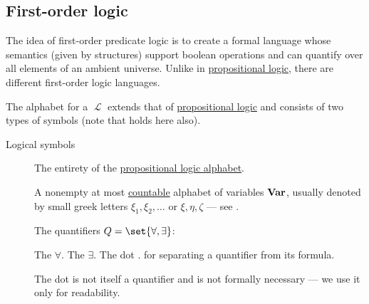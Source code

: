 \subsection{First-order logic}\label{subsec:first_order_logic}

\begin{definition}\label{def:first_order_language}
  The idea of first-order predicate logic is to create a formal language whose semantics (given by structures) support boolean operations and can quantify over all elements of an ambient universe. Unlike in \hyperref[subsec:propositional_logic]{propositional logic}, there are different first-order logic languages.

  The alphabet for a  \( \mscrL \) extends that of \hyperref[subsec:propositional_logic]{propositional logic} and consists of two types of symbols (note that  holds here also).

  \begin{description}
    \item[Logical symbols]
    \hfill
    \begin{thmenum}[series=def:first_order_language]
       The entirety of the \hyperref[subsec:propositional_logic]{propositional logic alphabet}.

       A nonempty at most \hyperref[rem:cardinals/countably_infinite]{countable} alphabet of variables \( \operatorname{\mathbf{Var}} \), usually denoted by small greek letters \( \xi_1, \xi_2, \ldots \) or \( \xi, \eta, \zeta \) --- see .

       The quantifiers \( Q = \set{ \forall, \exists } \):
      \begin{thmenum}
         The  \( \forall \).
         The  \( \exists \).
         The dot \( . \) for separating a quantifier from its formula.
      \end{thmenum}

      The dot is not itself a quantifier and is not formally necessary --- we use it only for readability.


\end{thmenum}
\end{description}
\end{definition}
